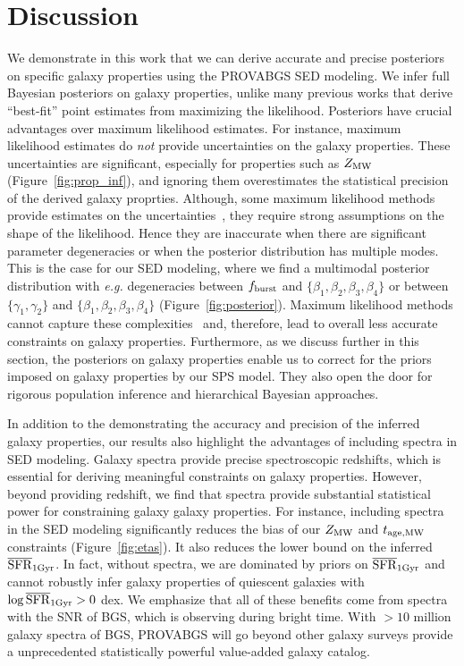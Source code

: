 \section{Discussion} \label{sec:discuss}
We demonstrate in this work that we can derive accurate and precise posteriors
on specific galaxy properties using the {\sc PROVABGS} SED modeling. 
We infer full Bayesian posteriors on galaxy properties, unlike many previous
works that derive ``best-fit'' point estimates from maximizing the likelihood.
Posteriors have crucial advantages over maximum likelihood estimates. 
For instance, maximum likelihood estimates do \emph{not} provide uncertainties
on the galaxy properties. 
These uncertainties are significant, especially for properties such as $Z_{\rm MW}$
(Figure~\ref{fig:prop_inf}), and ignoring them overestimates the statistical
precision of the derived galaxy proprties. 
Although, some maximum likelihood methods provide estimates on the
uncertainties~\citep[\emph{e.g.}][]{moustakas2013, boquien2019}, 
they require strong assumptions on the shape of the likelihood. 
Hence they are inaccurate when there are significant parameter degeneracies or
when the posterior distribution has multiple modes.
This is the case for our SED modeling, where we find a multimodal posterior
distribution with \emph{e.g.} degeneracies between $f_{\rm burst}$ and
$\{\beta_1, \beta_2, \beta_3, \beta_4\}$ or between 
$\{\gamma_1, \gamma_2\}$ and $\{\beta_1, \beta_2, \beta_3, \beta_4\}$
(Figure~\ref{fig:posterior}). 
Maximum likelihood methods cannot capture these
complexities~\citep[\emph{e.g.}][]{boquien2019} and, therefore, lead
to overall less accurate constraints on galaxy properties.  
Furthermore, as we discuss further in this section, the posteriors on galaxy
properties enable us to correct for the priors imposed on galaxy properties by
our SPS model.
They also open the door for rigorous population inference and hierarchical
Bayesian approaches. 

In addition to the demonstrating the accuracy and precision of the inferred
galaxy properties, our results also highlight the advantages of including
spectra in SED modeling. 
Galaxy spectra provide precise spectroscopic redshifts, which is essential for
deriving meaningful constraints on galaxy properties. 
However, beyond providing redshift, we find that spectra provide substantial
statistical power for constraining galaxy galaxy properties. 
For instance, including spectra in the SED modeling significantly reduces the
bias of our $Z_{\rm MW}$ and $t_{\rm age, MW}$ constraints (Figure~\ref{fig:etas}). 
It also reduces the lower bound on the inferred $\overline{\rm SFR}_{\rm 1Gyr}$. 
In fact, without spectra, we are dominated by priors on $\overline{\rm SFR}_{\rm 1Gyr}$ and cannot
robustly infer galaxy properties of quiescent galaxies with $\log\overline{\rm SFR}_{\rm 1Gyr} > 0$
dex.
We emphasize that all of these benefits come from spectra with the SNR of BGS,
which is observing during bright time. 
With ${>}10$ million galaxy spectra of BGS, {\sc PROVABGS} will go beyond other
galaxy surveys provide a unprecedented statistically powerful value-added
galaxy catalog. 


